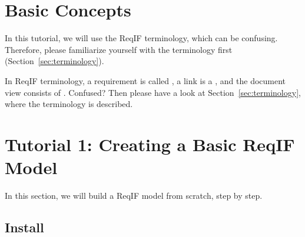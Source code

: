 % 

\section{Basic Concepts}
\label{sec:tutorial-basic-concepts}

In this tutorial, we will use the ReqIF terminology, which can be confusing.  Therefore, please familiarize yourself with the terminology first (Section~\ref{sec:terminology}).

\begin{warning}
In ReqIF terminology, a requirement is called , a link is a , and the document view consists of .  Confused? Then please have a look at Section~\ref{sec:terminology}, where the terminology is described.
\end{warning}

\section{Tutorial 1: Creating a Basic ReqIF Model}
\label{sec:tutorial-create-basic-model}

In this section, we will build a ReqIF model from scratch, step by step.

\subsection{Install \pror{}}
\label{sec:install-reqif-studio}

